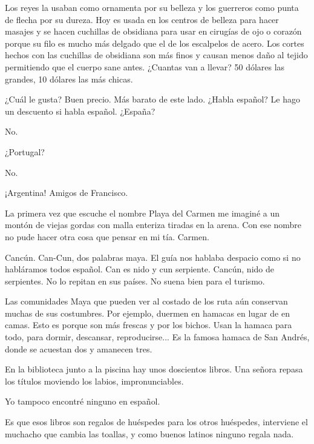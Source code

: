 \documentclass[11pt,twoside,openright,a6paper]{book}
\begin{document}
Los reyes la usaban como ornamenta por su belleza y los guerreros como punta de flecha por su dureza. Hoy es usada en los centros de belleza para hacer masajes y se hacen cuchillas de obsidiana para usar en cirugías de ojo o corazón porque su filo es mucho más delgado que el de los escalpelos de acero. Los cortes hechos con las cuchillas de obsidiana son más finos y causan menos daño al tejido permitiendo que el cuerpo sane antes. ¿Cuantas van a llevar? 50 dólares las grandes, 10 dólares las más chicas.

\vspace{0.5cm}

¿Cuál le gusta? Buen precio. Más barato de este lado. ¿Habla español? Le hago un descuento si habla español. ¿España?

No.

¿Portugal?

No.

¡Argentina! Amigos de Francisco.

\vspace{0.5cm}

La primera vez que escuche el nombre Playa del Carmen me imaginé a un montón de viejas gordas con malla enteriza tiradas en la arena. Con ese nombre no pude hacer otra cosa que pensar en mi tía. Carmen.

\vspace{0.5cm}

Cancún. Can-Cun, dos palabras maya. El guía nos hablaba despacio como si no habláramos todos español. Can es nido y cun serpiente. Cancún, nido de serpientes. No lo repitan en sus países. No suena bien para el turismo.

\vspace{0.5cm}

Las comunidades Maya que pueden ver al costado de los ruta aún conservan muchas de sus costumbres. Por ejemplo, duermen en hamacas en lugar de en camas. Esto es porque son más frescas y por los bichos. Usan la hamaca para todo, para dormir, descansar, reproducirse... Es la famosa hamaca de San Andrés, donde se acuestan dos y amanecen tres.

\vspace{0.5cm}

En la biblioteca junto a la piscina hay unos doscientos libros.
Una señora repasa los títulos moviendo los labios, impronunciables.

Yo tampoco encontré ninguno en español.

Es que esos libros son regalos de huéspedes para los otros huéspedes, interviene el muchacho que cambia las toallas, y como buenos latinos ninguno regala nada.
\end{document}
